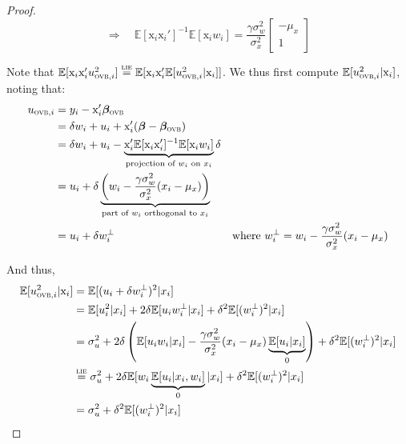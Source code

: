 \documentclass[a4paper, 11pt]{report}
\begin{document}
\begin{proof}
				\begin{equation}\label{bias_ovb}
					\Rightarrow \quad
					\mathbb{E}[\text{x}_{i}\text{x}_i']^{-1}\mathbb{E}[\text{x}_{i}w_i] 
					=
					\dfrac{\gamma\sigma_{w}^{2}}{\sigma_{x}^{2}}
					\begin{bmatrix}
				    		- \mu_{x} \\
						1
					\end{bmatrix} 
				\end{equation}
				
				Note that $\mathbb{E}[\text{x}_{i}\text{x}_{i}'u_{\textsc{ovb}, i}^{2}] \overset{\textsc{lie}}{=} \mathbb{E}[\text{x}_{i}\text{x}_{i}'\mathbb{E}[u_{\textsc{ovb}, i}^{2} | \text{x}_{i}]]$. We thus first compute $\mathbb{E}[u_{\textsc{ovb}, i}^{2} | \text{x}_{i}]$, noting that:
				~
				\begin{align*}
            				u_{\textsc{ovb}, i} & =  y_i - \text{x}_i'\bm{\beta}_{\textsc{ovb}} \\
            					& = \delta w_{i} + u_i + \text{x}_i' (\bm{\beta} - \bm{\beta}_{\textsc{ovb}})\\
            					& = \delta w_{i} + u_i - \underbrace{\text{x}_{i}' \mathbb{E}[\text{x}_{i}\text{x}_{i}']^{-1} \mathbb{E}[\text{x}_{i}w_{i}]}_{\text{projection of $w_i$ on $x_i$}} \delta\\
            					& =  u_i + \delta \underbrace{\left(w_{i} - \dfrac{\gamma\sigma_{w}^{2}}{\sigma_{x}^{2}} (x_{i} - \mu_{x})\right)}_{\text{part of $w_i$ orthogonal to $x_i$}}\\
						& = u_i + \delta w_{i}^{\perp} & \text{where } w_{i}^{\perp} = w_{i} - \dfrac{\gamma\sigma_{w}^{2}}{\sigma_{x}^{2}} (x_{i} - \mu_{x})
				\end{align*}
				
				And thus,
				\begin{align*}
            				\mathbb{E}[u_{\textsc{ovb}, i}^{2} | \text{x}_{i}] & = \mathbb{E}[(u_i + \delta w_{i}^{\perp})^{2}| x_{i}]\\
					& = \mathbb{E}[u_{i}^{2} | x_{i}] + 2\delta \mathbb{E}[u_{i}w_{i}^{\perp} | x_{i}] + \delta^{2}\mathbb{E}[(w_{i}^{\perp})^{2} | x_{i}]\\
					& = \sigma_{u}^{2} + 2\delta \left( \mathbb{E}[u_{i}w_{i} | x_{i}] -  \dfrac{\gamma\sigma_{w}^{2}}{\sigma_{x}^{2}} (x_{i} - \mu_{x})\underbrace{\mathbb{E}[u_{i}|x_{i}]}_{0} \right) + \delta^{2}\mathbb{E}[(w_{i}^{\perp})^{2} | x_{i}]\\
					& \overset{\textsc{lie}}{=} \sigma_{u}^{2} + 2\delta \mathbb{E}[w_{i} \underbrace{\mathbb{E}[u_{i} | x_{i}, w_{i}]}_{0} | x_{i}] + \delta^{2}\mathbb{E}[(w_{i}^{\perp})^{2} | x_{i}]\\
					& = \sigma_{u}^{2} +  \delta^{2}\mathbb{E}[(w_{i}^{\perp})^{2} | x_{i}]
				\end{align*}
				

\end{proof}
\end{document}
